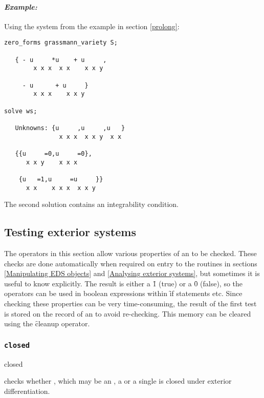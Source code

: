 \paragraph{\it Example:}
Using the system from the example in section \ref{prolong}:
\begin{verbatim}
zero_forms grassmann_variety S;

   { - u     *u    + u     ,
        x x x  x x    x x y 
   
     - u      + u     }
        x x x    x x y 

solve ws;

   Unknowns: {u     ,u     ,u   }
               x x x  x x y  x x
   
   {{u     =0,u     =0},
      x x y    x x x 
   
    {u   =1,u     =u     }}
      x x    x x x  x x y 
\end{verbatim}
The second solution contains an integrability condition.



\subsection{Testing exterior systems}
\label{Testing exterior systems}

The operators in this section allow various properties of an  to
be checked. These checks are done automatically when required on entry to
the routines in sections \ref{Manipulating EDS objects} and \ref{Analysing
exterior systems}, but sometimes it is useful to know explicitly. The
result is either a \f{1} (true) or a \f{0} (false), so the operators can be
used in boolean expressions within \f{if} statements etc.  Since checking
these properties can be very time-consuming, the result of the first test
is stored on the  record of an  to avoid
re-checking. This memory can be cleared using the \f{cleanup} operator.

\subsubsection{\tt closed}
\label{closed}

\begin{edssyntax}
	closed 
\end{edssyntax}
checks whether , which may be an , a  or a
single  is closed under exterior differentiation.

